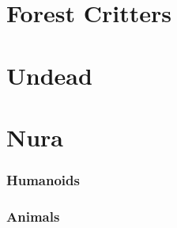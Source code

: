\documentclass[a4paper,openany]{book}
\begin{document}
\chapter{Forest Critters}

\begin{multicols}{2}

\bear

\boar

\chitincrawler

\basilisk

\end{multicols}

\chapter{Undead}

\begin{multicols}{2}

\ghoul

\ghast

\demilich

\lich

\end{multicols}

\chapter{Nura}

\begin{multicols}{2}

\subsection{Humanoids}


\goblin

\goblin

\goblinnuramancer

\hobgoblin

\ogre

\deepogre

\subsection{Animals}

\nurarat

\nurahorse

\nuracrab

\nuracat

\nuraslug

\nuraspider

\nurawolf

\end{multicols}
\end{document}
